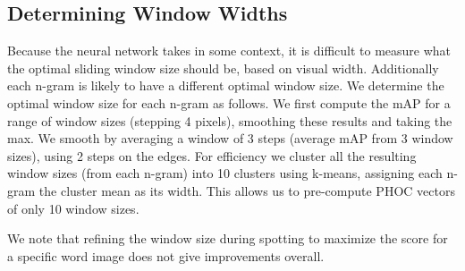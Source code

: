 \documentclass[ms,electronic,twosidetoc,letterpaper,chaptercenter,parttop,lof,lot]{byumsphd}
\begin{document}



\subsection{Determining Window Widths}\label{detirminewindowsize}
Because the neural network takes in some context, it is difficult to measure what the optimal sliding window size should be, based on visual width.
Additionally each n-gram is likely to have a different optimal window size. We determine the optimal window size for each n-gram as follows.
We first compute the mAP for a range of window sizes (stepping 4 pixels), smoothing these results and taking the max. We smooth by averaging a window of 3 steps (average mAP from 3 window sizes), using 2 steps on the edges. For efficiency we cluster all the resulting window sizes (from each n-gram) into 10 clusters using k-means, assigning each n-gram the cluster mean as its width. This allows us to pre-compute PHOC vectors of only 10 window sizes.%

We note that refining the window size during spotting to maximize the score for a specific word image does not give improvements overall.
\end{document}
